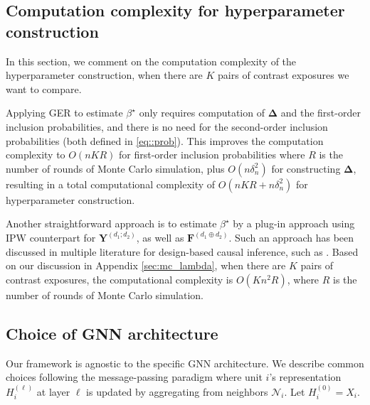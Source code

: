 \documentclass[twoside]{article}
\theoremstyle{plain}
\theoremstyle{definition}
\theoremstyle{remark}
\newcommand{\bY}{\boldsymbol{Y}}
\newcommand{\bF}{\boldsymbol{F}}
\newcommand{\bDelta}{\boldsymbol{\Delta}}
\newcommand{\cN}{\mathcal{N}}
\newcommand{\bFaug}{\bF^{(d_1\oplus d_2)}}
\begin{document}
\subsection{Computation complexity for hyperparameter construction}\label{sec:computation}

In this section, we comment on the computation complexity of the hyperparameter construction, when there are $K$ pairs of contrast exposures we want to compare.

Applying GER to estimate $\beta^\star$ only requires computation of $\bDelta$ and the first-order inclusion probabilities, and there is no need for the second-order inclusion probabilities (both defined in \eqref{eq::prob}). This improves the computation complexity to $O(nKR)$ for first-order inclusion probabilities where $R$ is the number of rounds of Monte Carlo simulation, plus $O(n \delta_n^2)$ for constructing $\bDelta$, resulting in a total computational complexity of $O(nKR + n \delta_n^2)$ for hyperparameter construction.

Another straightforward approach is to estimate $\beta^\star$ by a plug-in approach using IPW counterpart for $\bY^{(d_1;d_2)}$, as well as $\bFaug$. Such an approach has been discussed in multiple literature for design-based causal inference, such as \citet{middleton2018unified, chang2023design, lu2025design}. Based on our discussion in Appendix \ref{sec:mc_lambda}, when there are $K$ pairs of contrast exposures, the computational complexity is $O(K n^2 R)$, where $R$ is the number of rounds of Monte Carlo simulation.

\subsection{Choice of GNN architecture}\label{sec:gnn_choices}

Our framework is agnostic to the specific GNN architecture. We describe common choices following the message-passing paradigm where unit $i$'s representation $H_i^{(\ell)}$ at layer $\ell$ is updated by aggregating from neighbors $\cN_i$. Let $H_i^{(0)} = X_i$.
\end{document}

